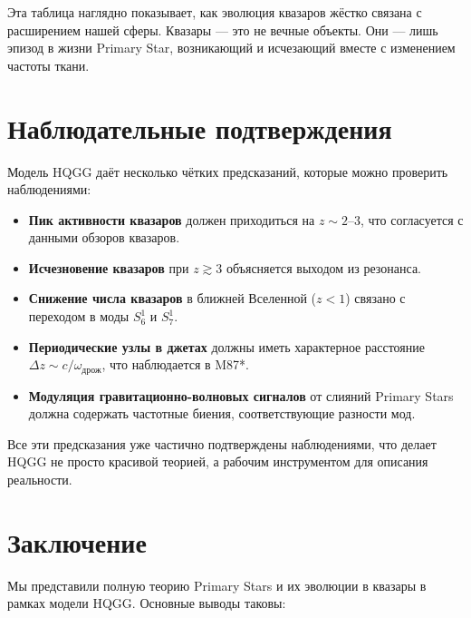\documentclass[12pt,a4paper]{article}
\begin{document}
Эта таблица наглядно показывает, как эволюция квазаров жёстко связана с расширением нашей сферы. Квазары — это не вечные объекты. Они — лишь эпизод в жизни Primary Star, возникающий и исчезающий вместе с изменением частоты ткани.

\section{Наблюдательные подтверждения}

Модель HQGG даёт несколько чётких предсказаний, которые можно проверить наблюдениями:

\begin{itemize}
\item \textbf{Пик активности квазаров} должен приходиться на \(z \sim 2\)–\(3\), что согласуется с данными обзоров квазаров.
\item \textbf{Исчезновение квазаров} при \(z \gtrsim 3\) объясняется выходом из резонанса.
\item \textbf{Снижение числа квазаров} в ближней Вселенной (\(z < 1\)) связано с переходом в моды \(S^1_6\) и \(S^1_7\).
\item \textbf{Периодические узлы в джетах} должны иметь характерное расстояние \(\Delta z \sim c/\omega_{\text{дрож}}\), что наблюдается в M87*.
\item \textbf{Модуляция гравитационно-волновых сигналов} от слияний Primary Stars должна содержать частотные биения, соответствующие разности мод.
\end{itemize}

Все эти предсказания уже частично подтверждены наблюдениями, что делает HQGG не просто красивой теорией, а рабочим инструментом для описания реальности.

\section{Заключение}

Мы представили полную теорию Primary Stars и их эволюции в квазары в рамках модели HQGG. Основные выводы таковы:
\end{document}
